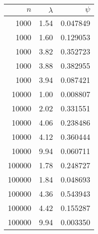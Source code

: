 \begin{tabular}{rrr}
\toprule
    $n$ &  $\lambda$ &    $\psi$ \\
\midrule
   1000 &       1.54 &  0.047849 \\
   1000 &       1.60 &  0.129053 \\
   1000 &       3.82 &  0.352723 \\
   1000 &       3.88 &  0.382955 \\
   1000 &       3.94 &  0.087421 \\
  10000 &       1.00 &  0.008807 \\
  10000 &       2.02 &  0.331551 \\
  10000 &       4.06 &  0.238486 \\
  10000 &       4.12 &  0.360444 \\
  10000 &       9.94 &  0.060711 \\
 100000 &       1.78 &  0.248727 \\
 100000 &       1.84 &  0.048693 \\
 100000 &       4.36 &  0.543943 \\
 100000 &       4.42 &  0.155287 \\
 100000 &       9.94 &  0.003350 \\
\bottomrule
\end{tabular}

